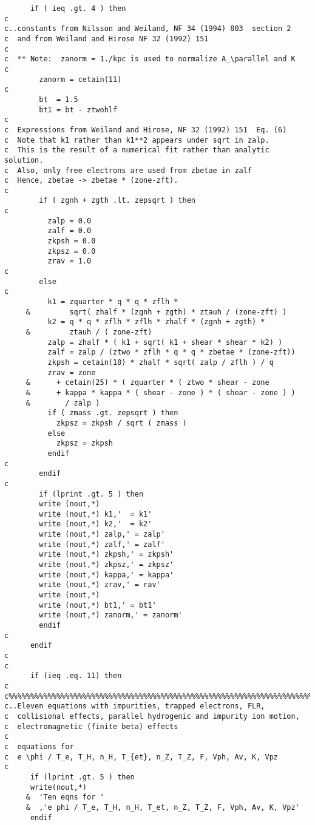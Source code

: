 \begin{verbatim}
      if ( ieq .gt. 4 ) then
c
c..constants from Nilsson and Weiland, NF 34 (1994) 803  section 2
c  and from Weiland and Hirose NF 32 (1992) 151
c
c  ** Note:  zanorm = 1./kpc is used to normalize A_\parallel and K
c
        zanorm = cetain(11)
c
        bt  = 1.5
        bt1 = bt - ztwohlf
c
c  Expressions from Weiland and Hirose, NF 32 (1992) 151  Eq. (6)
c  Note that k1 rather than k1**2 appears under sqrt in zalp.
c  This is the result of a numerical fit rather than analytic solution.
c  Also, only free electrons are used from zbetae in zalf
c  Hence, zbetae -> zbetae * (zone-zft).
c
        if ( zgnh + zgth .lt. zepsqrt ) then
c
          zalp = 0.0
          zalf = 0.0
          zkpsh = 0.0
          zkpsz = 0.0
          zrav = 1.0
c
        else
c
          k1 = zquarter * q * q * zflh *
     &         sqrt( zhalf * (zgnh + zgth) * ztauh / (zone-zft) )
          k2 = q * q * zflh * zflh * zhalf * (zgnh + zgth) *
     &         ztauh / ( zone-zft)
          zalp = zhalf * ( k1 + sqrt( k1 + shear * shear * k2) )
          zalf = zalp / (ztwo * zflh * q * q * zbetae * (zone-zft))
          zkpsh = cetain(10) * zhalf * sqrt( zalp / zflh ) / q
          zrav = zone
     &      + cetain(25) * ( zquarter * ( ztwo * shear - zone
     &      + kappa * kappa * ( shear - zone ) * ( shear - zone ) )
     &        / zalp )
          if ( zmass .gt. zepsqrt ) then
            zkpsz = zkpsh / sqrt ( zmass )
          else
            zkpsz = zkpsh
          endif
c
        endif
c
        if (lprint .gt. 5 ) then
        write (nout,*)
        write (nout,*) k1,'  = k1'
        write (nout,*) k2,'  = k2'
        write (nout,*) zalp,' = zalp'
        write (nout,*) zalf,' = zalf'
        write (nout,*) zkpsh,' = zkpsh'
        write (nout,*) zkpsz,' = zkpsz'
        write (nout,*) kappa,' = kappa'
        write (nout,*) zrav,' = rav'
        write (nout,*)
        write (nout,*) bt1,' = bt1'
        write (nout,*) zanorm,' = zanorm'
        endif
c
      endif
c
c
      if (ieq .eq. 11) then
c
c%%%%%%%%%%%%%%%%%%%%%%%%%%%%%%%%%%%%%%%%%%%%%%%%%%%%%%%%%%%%%%%%%%%%%%%%%%
c..Eleven equations with impurities, trapped electrons, FLR,
c  collisional effects, parallel hydrogenic and impurity ion motion,
c  electromagnetic (finite beta) effects
c
c  equations for
c  e \phi / T_e, T_H, n_H, T_{et}, n_Z, T_Z, F, Vph, Av, K, Vpz
c
      if (lprint .gt. 5 ) then
      write(nout,*)
     &  'Ten eqns for '
     &  ,'e phi / T_e, T_H, n_H, T_et, n_Z, T_Z, F, Vph, Av, K, Vpz'
      endif


\end{verbatim}
